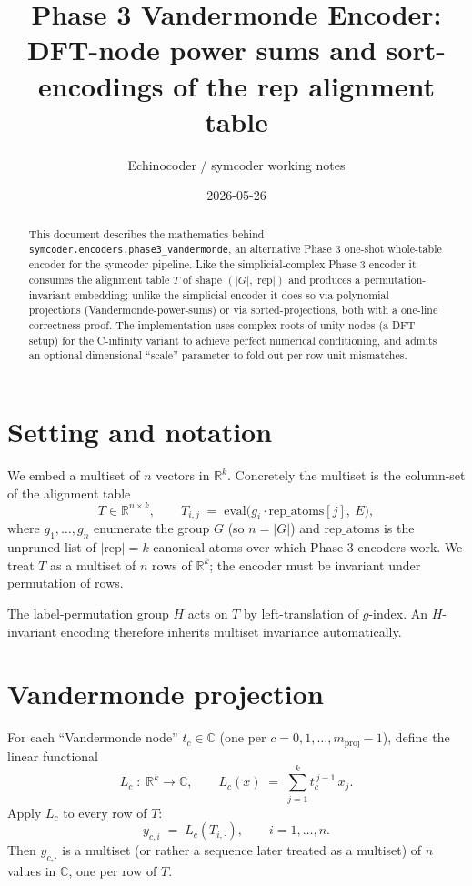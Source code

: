 \documentclass[a4paper,11pt]{article}
\title{Phase 3 Vandermonde Encoder: \\
       \large DFT-node power sums and sort-encodings of the
              rep alignment table}
\author{Echinocoder / symcoder working notes}
\date{2026-05-26}
\begin{document}
\maketitle

\begin{abstract}
This document describes the mathematics behind
\texttt{symcoder.encoders.phase3\_vandermonde}, an alternative Phase 3
one-shot whole-table encoder for the symcoder pipeline.  Like the
simplicial-complex Phase 3 encoder it consumes the alignment table $T$
of shape $(|G|, |\text{rep}|)$ and produces a permutation-invariant
embedding; unlike the simplicial encoder it does so via polynomial
projections (Vandermonde-power-sums) or via sorted-projections, both with
a one-line correctness proof.  The implementation uses complex
roots-of-unity nodes (a DFT setup) for the C-infinity variant to achieve
perfect numerical conditioning, and admits an optional dimensional
``scale'' parameter to fold out per-row unit mismatches.
\end{abstract}

\tableofcontents
\newpage

\section{Setting and notation}

We embed a multiset of $n$ vectors in $\mathbb{R}^k$.  Concretely the
multiset is the column-set of the alignment table
\[
  T \in \mathbb{R}^{n \times k}, \qquad
  T_{i, j} \;=\; \text{eval}\!\bigl(g_i \cdot \text{rep\_atoms}[j],\ E\bigr),
\]
where $g_1, \ldots, g_n$ enumerate the group $G$ (so $n = |G|$) and
$\text{rep\_atoms}$ is the unpruned list of $|\text{rep}| = k$
canonical atoms over which Phase 3 encoders work.  We treat $T$ as a
multiset of $n$ rows of $\mathbb{R}^k$; the encoder must be invariant
under permutation of rows.

The label-permutation group $H$ acts on $T$ by left-translation of
$g$-index.  An $H$-invariant encoding therefore inherits multiset
invariance automatically.

\section{Vandermonde projection}

For each ``Vandermonde node'' $t_c \in \mathbb{C}$ (one per
$c = 0, 1, \ldots, m_{\text{proj}} - 1$), define the linear functional
\[
  L_c \;:\; \mathbb{R}^k \to \mathbb{C}, \qquad
  L_c(x) \;=\; \sum_{j=1}^{k} t_c^{\,j-1}\, x_j.
\]
Apply $L_c$ to every row of $T$:
\[
  y_{c, i} \;=\; L_c(T_{i, \cdot}), \qquad i = 1, \ldots, n.
\]
Then $y_{c, \cdot}$ is a multiset (or rather a sequence
later treated as a multiset) of $n$ values in $\mathbb{C}$, one per row
of $T$.
\end{document}
